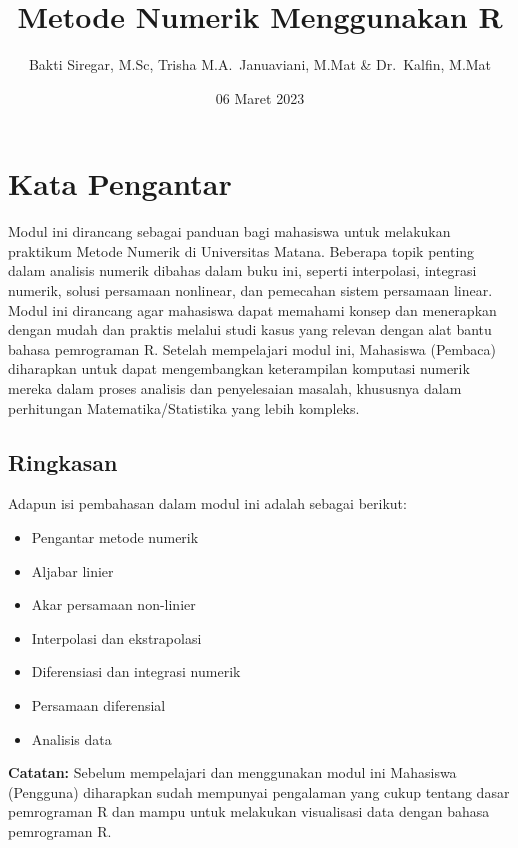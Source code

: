 \documentclass[
]{book}
\title{Metode Numerik Menggunakan R}
\author{Bakti Siregar, M.Sc, Trisha M.A.~Januaviani, M.Mat \& Dr.~Kalfin, M.Mat}
\date{06 Maret 2023}
\providecommand{\tightlist}{%
  \setlength{\itemsep}{0pt}\setlength{\parskip}{0pt}}
\theoremstyle{definition}
\theoremstyle{definition}
\theoremstyle{definition}
\theoremstyle{definition}
\theoremstyle{remark}
\begin{document}
\maketitle

{
\setcounter{tocdepth}{1}
\tableofcontents
}
\hypertarget{kata-pengantar}{%
\chapter*{Kata Pengantar}\label{kata-pengantar}}

Modul ini dirancang sebagai panduan bagi mahasiswa untuk melakukan praktikum Metode Numerik di Universitas Matana. Beberapa topik penting dalam analisis numerik dibahas dalam buku ini, seperti interpolasi, integrasi numerik, solusi persamaan nonlinear, dan pemecahan sistem persamaan linear. Modul ini dirancang agar mahasiswa dapat memahami konsep dan menerapkan dengan mudah dan praktis melalui studi kasus yang relevan dengan alat bantu bahasa pemrograman R. Setelah mempelajari modul ini, Mahasiswa (Pembaca) diharapkan untuk dapat mengembangkan keterampilan komputasi numerik mereka dalam proses analisis dan penyelesaian masalah, khususnya dalam perhitungan Matematika/Statistika yang lebih kompleks.

\hypertarget{ringkasan}{%
\section*{Ringkasan}\label{ringkasan}}

Adapun isi pembahasan dalam modul ini adalah sebagai berikut:

\begin{itemize}
\tightlist
\item
  Pengantar metode numerik
\item
  Aljabar linier
\item
  Akar persamaan non-linier
\item
  Interpolasi dan ekstrapolasi
\item
  Diferensiasi dan integrasi numerik
\item
  Persamaan diferensial
\item
  Analisis data
\end{itemize}

\textbf{Catatan:} Sebelum mempelajari dan menggunakan modul ini Mahasiswa (Pengguna) diharapkan sudah mempunyai pengalaman yang cukup tentang dasar pemrograman R dan mampu untuk melakukan visualisasi data dengan bahasa pemrograman R.
\end{document}
